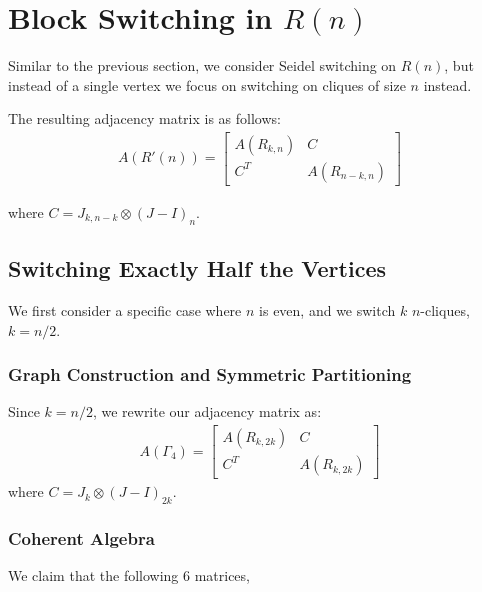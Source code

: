 \section{Block Switching in \texorpdfstring{$R(n)$}{R(n)}}
Similar to the previous section, we consider Seidel switching on $R(n)$, but instead of a single vertex we focus on switching on cliques of size $n$ instead.

The resulting adjacency matrix is as follows:
\begin{align*}
    A(R'(n)) = \begin{bmatrix}
        A(R_{k,n}) & C \\
        C^T & A(R_{n-k, n})
    \end{bmatrix}
\end{align*}

where $C = J_{k, n-k} \otimes (J-I)_n$.

\subsection{Switching Exactly Half the Vertices}
We first consider a specific case where $n$ is even, and we switch $k$ $n$-cliques, $k=n/2$. 
\subsubsection{Graph Construction and Symmetric Partitioning}
Since $k = n/2$, we rewrite our adjacency matrix as:
\begin{align*}
    A(\Gamma_{4}) = \begin{bmatrix}
        A(R_{k,2k}) & C \\
        C^T & A(R_{k, 2k})
    \end{bmatrix}
\end{align*}
where $C = J_{k} \otimes (J-I)_{2k}$.

\subsubsection{Coherent Algebra}

We claim that the following 6 matrices,

